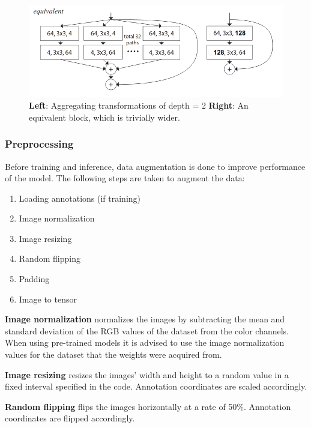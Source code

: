 \documentclass[oneside, english, bibtex]{kththesis}
\begin{document}
\begin{figure}[H]
  \begin{center}
    \includegraphics[width=1.0\textwidth]{figures/resnext-depth.png}
  \end{center}
  \caption{\textbf{Left}: Aggregating transformations of depth = 2 \textbf{Right}: An equivalent block, which is trivially wider.~\cite{DBLP:journals/corr/XieGDTH16}}
  \label{fig:depth}
\end{figure}



\subsubsection{Preprocessing}

Before training and inference, data augmentation is done to improve performance of the model. The following steps are taken to augment the data:

\begin{enumerate}
\item Loading annotations (if training)
\item Image normalization
\item Image resizing
\item Random flipping
\item Padding
\item Image to tensor
\end{enumerate}

\textbf{Image normalization} normalizes the images by subtracting the mean and standard deviation of the RGB values of the dataset from the color channels.
When using pre-trained models it is advised to use the image normalization values for the dataset that the weights were acquired from.

\textbf{Image resizing} resizes the images' width and height to a random value in a fixed interval specified in the code. Annotation coordinates are scaled accordingly.

\textbf{Random flipping} flips the images horizontally at a rate of 50\%. Annotation coordinates are flipped accordingly.
\end{document}
